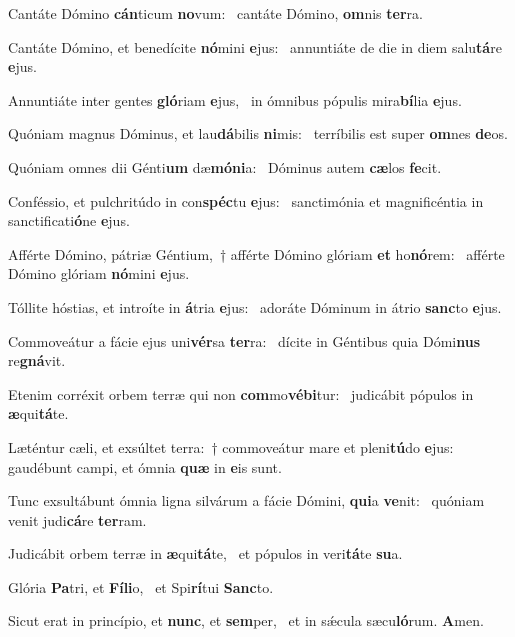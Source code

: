\item Cantáte Dómino \textbf{cán}ticum \textbf{no}vum:~\psstar{} cantáte Dómino, \textbf{om}nis \textbf{ter}ra.
\item Cantáte Dómino, et benedícite \textbf{nó}mini \textbf{e}jus:~\psstar{} annuntiáte de die in diem salu\textbf{tá}re \textbf{e}jus.
\item Annuntiáte inter gentes \textbf{gló}riam \textbf{e}jus,~\psstar{} in ómnibus pópulis mira\textbf{bí}lia \textbf{e}jus.
\item Quóniam magnus Dóminus, et lau\textbf{dá}bilis \textbf{ni}mis:~\psstar{} terríbilis est super \textbf{om}nes \textbf{de}os.
\item Quóniam omnes dii Génti\textbf{um} dæ\textbf{mó}\textbf{ni}a:~\psstar{} Dóminus autem \textbf{cæ}los \textbf{fe}cit.
\item Conféssio, et pulchritúdo in con\textbf{spéc}tu \textbf{e}jus:~\psstar{} sanctimónia et magnificéntia in sanctificati\textbf{ó}ne \textbf{e}jus.
\item Afférte Dómino, pátriæ Géntium,~† afférte Dómino glóriam \textbf{et} ho\textbf{nó}rem:~\psstar{} afférte Dómino glóriam \textbf{nó}mini \textbf{e}jus.
\item Tóllite hóstias, et introíte in \textbf{á}tria \textbf{e}jus:~\psstar{} adoráte Dóminum in átrio \textbf{sanc}to \textbf{e}jus.
\item Commoveátur a fácie ejus uni\textbf{vér}sa \textbf{ter}ra:~\psstar{} dícite in Géntibus quia Dómi\textbf{nus} re\textbf{gná}vit.
\item Etenim corréxit orbem terræ qui non \textbf{com}mo\textbf{vé}\textbf{bi}tur:~\psstar{} judicábit pópulos in \textbf{æ}qui\textbf{tá}te.
\item Læténtur cæli, et exsúltet terra:~† commoveátur mare et pleni\textbf{tú}do \textbf{e}jus:~\psstar{} gaudébunt campi, et ómnia \textbf{quæ} in \textbf{e}is sunt.
\item Tunc exsultábunt ómnia ligna silvárum a fácie Dómini, \textbf{qui}a \textbf{ve}nit:~\psstar{} quóniam venit judi\textbf{cá}re \textbf{ter}ram.
\item Judicábit orbem terræ in \textbf{æ}qui\textbf{tá}te,~\psstar{} et pópulos in veri\textbf{tá}te \textbf{su}a.
\item Glória \textbf{Pa}tri, et \textbf{Fí}\textbf{li}o,~\psstar{} et Spi\textbf{rí}tui \textbf{Sanc}to.
\item Sicut erat in princípio, et \textbf{nunc}, et \textbf{sem}per,~\psstar{} et in sǽcula sæcu\textbf{ló}rum. \textbf{A}men.